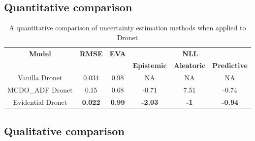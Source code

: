 \subsection{Quantitative comparison}
\begin{table}[h!]
	\centering
	\begin{tabular}{|c|c|c|c|c|c|}
		\hline
		\multirow{2}{*}{\textbf{Model}} & \multirow{2}{*}{\textbf{RMSE}} & \multirow{2}{*}{\textbf{EVA}} & \multicolumn{3}{c|}{\textbf{NLL}}                             \\ \cline{4-6} 
		&                                &                               & \textbf{Epistemic} & \textbf{Aleatoric} & \textbf{Predictive} \\ \hline
		Vanilla Dronet                  & 0.034                          & 0.98                          & NA                 & NA                 & NA                  \\ \hline
		MCDO\_ADF Dronet                & 0.15                           & 0.68                          & -0.71              & 7.51               & -0.74               \\ \hline
		Evidential Dronet               & \textbf{0.022}                 & \textbf{0.99}                 & \textbf{-2.03}     & \textbf{-1}        & \textbf{-0.94}      \\ \hline
	\end{tabular}
\caption{A quantitative comparison of uncertainty estimation methods when applied to Dronet}
\label{tab_quant_compare}
\end{table}

\subsection{Qualitative comparison }  

